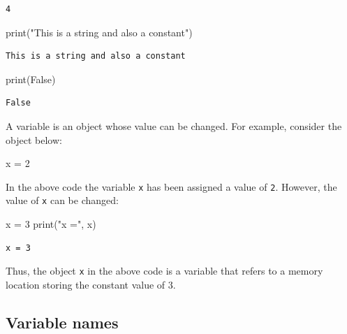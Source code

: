 \documentclass[
  letterpaper,
  DIV=11,
  numbers=noendperiod]{scrreprt}
\newenvironment{Shaded}{\begin{snugshade}}{\end{snugshade}}
\newcommand{\BuiltInTok}[1]{\textcolor[rgb]{0.00,0.23,0.31}{#1}}
\newcommand{\DecValTok}[1]{\textcolor[rgb]{0.68,0.00,0.00}{#1}}
\newcommand{\NormalTok}[1]{\textcolor[rgb]{0.00,0.23,0.31}{#1}}
\newcommand{\OperatorTok}[1]{\textcolor[rgb]{0.37,0.37,0.37}{#1}}
\newcommand{\StringTok}[1]{\textcolor[rgb]{0.13,0.47,0.30}{#1}}
\newcommand{\VariableTok}[1]{\textcolor[rgb]{0.07,0.07,0.07}{#1}}
\begin{document}
\begin{verbatim}
4
\end{verbatim}

\begin{Shaded}
\begin{Highlighting}[]
\BuiltInTok{print}\NormalTok{(}\StringTok{"This is a string and also a constant"}\NormalTok{)}
\end{Highlighting}
\end{Shaded}

\begin{verbatim}
This is a string and also a constant
\end{verbatim}

\begin{Shaded}
\begin{Highlighting}[]
\BuiltInTok{print}\NormalTok{(}\VariableTok{False}\NormalTok{)}
\end{Highlighting}
\end{Shaded}

\begin{verbatim}
False
\end{verbatim}

A variable is an object whose value can be changed. For example,
consider the object below:

\begin{Shaded}
\begin{Highlighting}[]
\NormalTok{x }\OperatorTok{=} \DecValTok{2}
\end{Highlighting}
\end{Shaded}

In the above code the variable \texttt{x} has been assigned a value of
\texttt{2}. However, the value of \texttt{x} can be changed:

\begin{Shaded}
\begin{Highlighting}[]
\NormalTok{x }\OperatorTok{=} \DecValTok{3}
\BuiltInTok{print}\NormalTok{(}\StringTok{"x ="}\NormalTok{, x)}
\end{Highlighting}
\end{Shaded}

\begin{verbatim}
x = 3
\end{verbatim}

Thus, the object \texttt{x} in the above code is a variable that refers
to a memory location storing the constant value of 3.

\hypertarget{variable-names}{%
\subsection{Variable names}\label{variable-names}}
\end{document}

